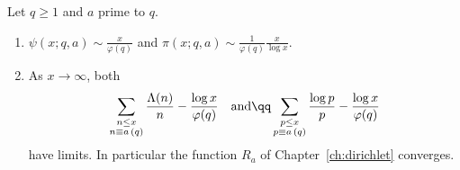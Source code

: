 \begin{theorem}\label{thm:pntap}
Let $q\ge1$ and $a$ prime to $q$.
\begin{enumerate}[label=(\alph*)]
\item $\psi(x;q,a)\sim\frac x{\varphi(q)}$ and $\pi(x;q,a)\sim\frac1{\varphi(q)}\frac x{\log x}$.
\item As $x\to\infty$, both
\[
\begin{gathered}\sum_{\substack{n\le x\\n\equiv a\,(q)}}\frac{\Lambda(n)}n-\frac{\log x}{\varphi(q)}\quad\text{and}\qq\sum_{\substack{p\le x\\p\equiv a\,(q)}}\frac{\log p}p-\frac{\log x}{\varphi(q)}\end{gathered}
\]
have limits. In particular the function $R_a$ of Chapter~\ref{ch:dirichlet} converges.
\end{enumerate}
\end{theorem}
